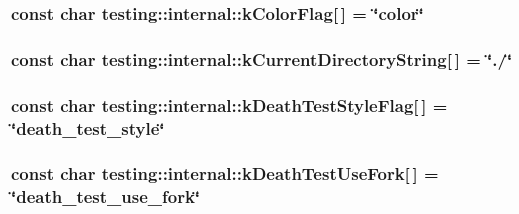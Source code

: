 \subsubsection[{k\+Color\+Flag}]{\setlength{\rightskip}{0pt plus 5cm}const char testing\+::internal\+::k\+Color\+Flag\mbox{[}$\,$\mbox{]} = \char`\"{}color\char`\"{}}\label{namespacetesting_1_1internal_a884ff13b75232fbe7daa0caf46f1de66}
\hypertarget{namespacetesting_1_1internal_a23a8e9527d0e544e7df2d64ad549ce3e}{}
\subsubsection[{k\+Current\+Directory\+String}]{\setlength{\rightskip}{0pt plus 5cm}const char testing\+::internal\+::k\+Current\+Directory\+String\mbox{[}$\,$\mbox{]} = \char`\"{}./\char`\"{}}\label{namespacetesting_1_1internal_a23a8e9527d0e544e7df2d64ad549ce3e}
\hypertarget{namespacetesting_1_1internal_a008ebfe0c0347d65e5e06e4d310981b3}{}
\subsubsection[{k\+Death\+Test\+Style\+Flag}]{\setlength{\rightskip}{0pt plus 5cm}const char testing\+::internal\+::k\+Death\+Test\+Style\+Flag\mbox{[}$\,$\mbox{]} = \char`\"{}death\+\_\+test\+\_\+style\char`\"{}}\label{namespacetesting_1_1internal_a008ebfe0c0347d65e5e06e4d310981b3}
\hypertarget{namespacetesting_1_1internal_a32051e2574562b548be3e26a52eaa553}{}
\subsubsection[{k\+Death\+Test\+Use\+Fork}]{\setlength{\rightskip}{0pt plus 5cm}const char testing\+::internal\+::k\+Death\+Test\+Use\+Fork\mbox{[}$\,$\mbox{]} = \char`\"{}death\+\_\+test\+\_\+use\+\_\+fork\char`\"{}}\label{namespacetesting_1_1internal_a32051e2574562b548be3e26a52eaa553}
\hypertarget{namespacetesting_1_1internal_a8cb8ee7fe7659e6916a0108dffa2f7dc}{}

